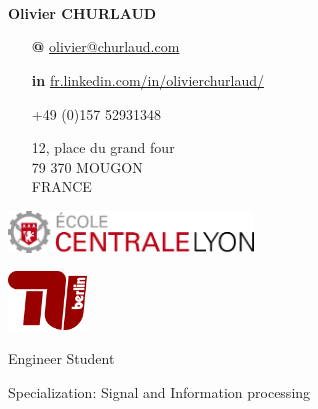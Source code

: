 \documentclass[skip,a4paper]{article}
\begin{document}
\fontsize{8.5}{9.5}
\selectfont

\begin{minipage}[c]{\linewidth}
	\begin{minipage}[c][4cm]{2.6cm}
		~\\~\\
		\vfill
		~
	\end{minipage}
	\begin{minipage}[c][4cm]{5.5cm}
		\textbf{Olivier CHURLAUD}
		
		\begin{itemize}[itemsep=0.5ex,leftmargin=3ex]
			\footnotesize
			\item[\bfseries @] \url{olivier@churlaud.com}
			\item[\bfseries \color{blue} in] {\scriptsize\url{ fr.linkedin.com/in/olivierchurlaud/}}
			\item[\Telefon] +49 (0)157 52931348
			\item[\Letter] 12, place du grand four \\
			79 370 MOUGON \\ 
			FRANCE
		\end{itemize}
	\end{minipage}
	\begin{minipage}[c][4cm]{10cm}
		\begin{minipage}[c]{7.10cm}
			\includegraphics[width=6.5cm]{img/ecl}
		\end{minipage}
		\hfill
		\begin{minipage}[c]{2.5cm}
			\includegraphics[width=2.1cm]{img/tuberlin}
		\end{minipage}
		
		\vfill
		
		\centering
		{
			\setlength{\parskip}{10pt plus 1pt minus 1pt}
			{\LARGE Engineer Student}
			
			{\Large Specialization: Signal and Information processing}
		}
	\end{minipage}
\end{minipage}
\end{document}
